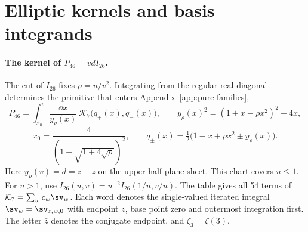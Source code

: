 \section{Elliptic kernels and basis integrands}\label{app:kernel}

\paragraph{The kernel of \(P_{46}=vdI_{26}\).}
The cut of \(I_{26}\) fixes \(\rho=u/v^2\). Integrating from the regular real
diagonal determines the primitive that enters Appendix~\ref{app:pure-families},
\[
 P_{46}=\int_{x_0}^{v}\frac{\dd x}{y_\rho(x)}\,
    \mathcal K_7\big(q_+(x),q_-(x)\big),
 \qquad y_\rho(x)^2=(1+x-\rho x^2)^2-4x,
\]
\[
 x_0=\frac{4}{(1+\sqrt{1+4\sqrt\rho})^2},
 \qquad q_\pm(x)=\tfrac12\big(1-x+\rho x^2\pm y_\rho(x)\big).
\]
Here \(y_\rho(v)=d=z-\bar z\) on the upper half-plane sheet. This chart
covers \(u\leq 1\). For \(u>1\), use \(I_{26}(u,v)=u^{-2}I_{26}(1/u,v/u)\).
The table gives all 54 terms of \(\mathcal K_7=\sum_w c_w\sv_w\). Each
word denotes the single-valued iterated integral \(\sv_w=\sv_{z,w,0}\)
with endpoint \(z\), base point zero and outermost integration first.
The letter \(\bar z\) denotes the conjugate endpoint, and
\(\zeta_3=\zeta(3)\).

